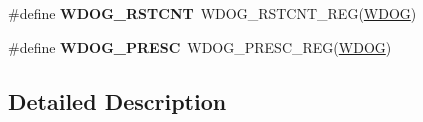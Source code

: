 \begin{DoxyCompactItemize}
\item 
\#define {\bfseries W\+D\+O\+G\+\_\+\+R\+S\+T\+C\+NT}~W\+D\+O\+G\+\_\+\+R\+S\+T\+C\+N\+T\+\_\+\+R\+EG(\hyperlink{group__WDOG__Peripheral__Access__Layer_gab938901a5fa5443253fc293ebd0399e3}{W\+D\+OG})\hypertarget{group__WDOG__Register__Accessor__Macros_gae3600ebbeca42091142fe17f7f2eab6a}{}\label{group__WDOG__Register__Accessor__Macros_gae3600ebbeca42091142fe17f7f2eab6a}

\item 
\#define {\bfseries W\+D\+O\+G\+\_\+\+P\+R\+E\+SC}~W\+D\+O\+G\+\_\+\+P\+R\+E\+S\+C\+\_\+\+R\+EG(\hyperlink{group__WDOG__Peripheral__Access__Layer_gab938901a5fa5443253fc293ebd0399e3}{W\+D\+OG})\hypertarget{group__WDOG__Register__Accessor__Macros_gac927e6dd73774cbbb57d36bbe3351925}{}\label{group__WDOG__Register__Accessor__Macros_gac927e6dd73774cbbb57d36bbe3351925}

\end{DoxyCompactItemize}


\subsection{Detailed Description}
